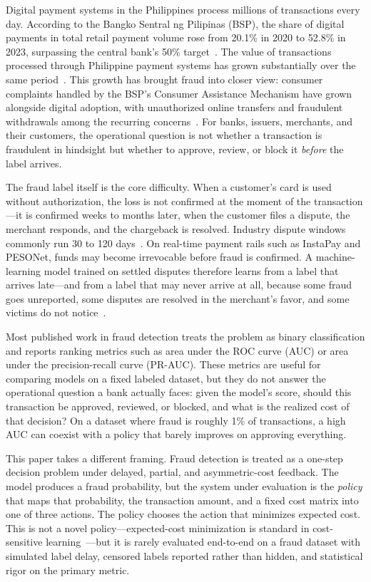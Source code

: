 \documentclass[conference]{IEEEtran}
\begin{document}
Digital payment systems in the Philippines process millions of
transactions every day. According to the Bangko Sentral ng Pilipinas
(BSP), the share of digital payments in total retail payment volume rose
from 20.1\% in 2020 to 52.8\% in 2023, surpassing the central bank's
50\% target~\cite{bsp2023roadmap}. The value of transactions processed through Philippine payment systems
has grown substantially over the same period~\cite{bspspei}. This
growth has brought fraud into closer view: consumer complaints handled by
the BSP's Consumer Assistance Mechanism have grown alongside digital
adoption, with unauthorized online transfers and fraudulent withdrawals
among the recurring concerns~\cite{bspcam}. For banks, issuers, merchants, and their
customers, the operational question is not whether a transaction is
fraudulent in hindsight but whether to approve, review, or block it
\emph{before} the label arrives.

The fraud label itself is the core difficulty. When a customer's card is
used without authorization, the loss is not confirmed at the moment of the
transaction---it is confirmed weeks to months later, when the customer
files a dispute, the merchant responds, and the chargeback is resolved.
Industry dispute windows commonly run 30 to 120 days~\cite{visa}. On
real-time payment rails such as InstaPay and PESONet, funds may become
irrevocable before fraud is confirmed. A machine-learning model trained on
settled disputes therefore learns from a label that arrives late---and
from a label that may never arrive at all, because some fraud goes
unreported, some disputes are resolved in the merchant's favor, and some
victims do not notice~\cite{chapelle2014}.

Most published work in fraud detection treats the problem as binary
classification and reports ranking metrics such as area under the ROC
curve (AUC) or area under the precision-recall curve (PR-AUC). These
metrics are useful for comparing models on a fixed labeled dataset, but
they do not answer the operational question a bank actually faces: given
the model's score, should this transaction be approved, reviewed, or
blocked, and what is the realized cost of that decision? On a dataset
where fraud is roughly 1\% of transactions, a high AUC can coexist with a
policy that barely improves on approving everything.

This paper takes a different framing. Fraud detection is treated as a
one-step decision problem under delayed, partial, and asymmetric-cost
feedback. The model produces a fraud probability, but the system under
evaluation is the \emph{policy} that maps that probability, the transaction
amount, and a fixed cost matrix into one of three actions. The policy
chooses the action that minimizes expected cost. This is not a novel
policy---expected-cost minimization is standard in cost-sensitive
learning~\cite{elkan2001}---but it is rarely evaluated end-to-end on a
fraud dataset with simulated label delay, censored labels reported rather
than hidden, and statistical rigor on the primary metric.
\end{document}
